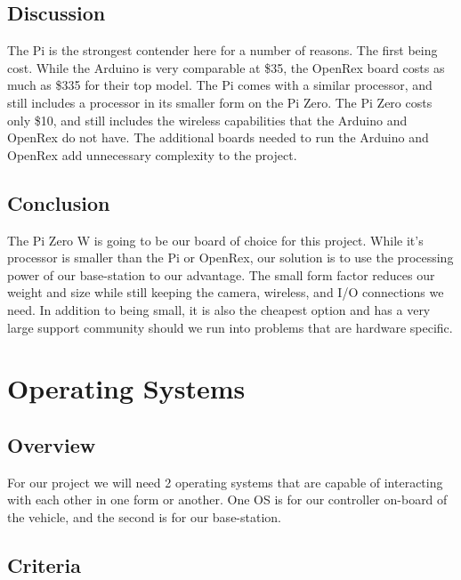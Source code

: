 \documentclass[letterpaper, 10, draftclsnofoot, onecolumn, compsoc]{IEEEtran}
\begin{document}

\subsection{Discussion}

The Pi is the strongest contender here for a number of reasons. The 
first being cost. While the Arduino is very comparable at \$35, the 
OpenRex board costs as much as \$335 for their top model. The Pi 
comes with a similar processor, and still includes a processor in 
its smaller form on the Pi Zero. The Pi Zero costs only \$10, and 
still includes the wireless capabilities that the Arduino and 
OpenRex do not have. The additional boards needed to run the 
Arduino and OpenRex add unnecessary complexity to the project. 

\subsection{Conclusion}

The Pi Zero W is going to be our board of choice for this project. 
While it's processor is smaller than the Pi or OpenRex, our 
solution is to use the processing power of our base-station to our 
advantage. The small form factor reduces our weight and size while 
still keeping the camera, wireless, and I/O connections we need. In 
addition to being small, it is also the cheapest option and has a 
very large support community should we run into problems that are 
hardware specific. 





\section{Operating Systems}

\subsection{Overview}

For our project we will need 2 operating systems that are capable 
of interacting with each other in one form or another. One OS is for 
our controller on-board of the vehicle, and the second is for our 
base-station. 

\subsection{Criteria}
\end{document}
